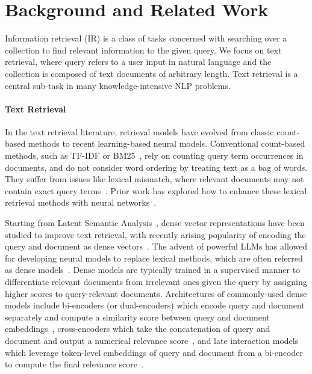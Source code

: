 \documentclass{article}
\begin{document}
\vspace{10pt}

\section{Background and Related Work}

Information retrieval (IR) is a class of tasks concerned with searching over a collection to find relevant information to the given query. We focus on text retrieval, where query refers to a user input in natural language and the collection is composed of text documents of arbitrary length. Text retrieval is a central sub-task in many knowledge-intensive NLP problems. 


\paragraph{Text Retrieval}
In the text retrieval literature, retrieval models have evolved from classic count-based methods to recent learning-based neural models. 
Conventional count-based methods, such as TF-IDF or BM25~\citep{Robertson2009ThePR}, rely on counting query term occurrences in documents, and do not consider word ordering by treating text as a bag of words.  They suffer from issues like lexical mismatch, where relevant documents may not contain exact query terms~\citep{Berger2000BridgingTL}. Prior work has explored how to enhance these lexical retrieval methods with neural networks~\citep{Nogueira2019DocumentEB, Cheriton2019FromDT, Zhao2020SPARTAEO}.

Starting from Latent Semantic Analysis~\citep{Deerwester1990IndexingBL}, dense vector representations have been studied to improve text retrieval, with recently arising popularity of encoding the query and document as dense vectors~\citep{Yih2011LearningDP, Huang2013LearningDS,Gillick2018EndtoEndRI}.
The advent of powerful LLMs has allowed for developing neural models to replace lexical methods, which are often referred as dense models~\citep{Nogueira2019PassageRW, Karpukhin2020DensePR, Humeau2020PolyencodersAA}. Dense models are typically trained in a supervised manner to differentiate relevant documents from irrelevant ones given the query by assigning higher scores to query-relevant documents. 
Architectures of commonly-used dense models include bi-encoders (or dual-encoders) which encode query and document separately and compute a similarity score between query and document embeddings~\citep{Guo2020MultiReQAAC,Liang2020EmbeddingbasedZR,Karpukhin2020DensePR, Ma2021ZeroshotNP,Ni2021LargeDE}, cross-encoders which take the concatenation of query and document and output a numerical relevance score~\citep{Nogueira2019PassageRW}, and late interaction models which leverage token-level embeddings of query and document from a bi-encoder to compute the final relevance score~\citep{khattab2020colbert, Santhanam2021ColBERTv2EA}.
\end{document}
